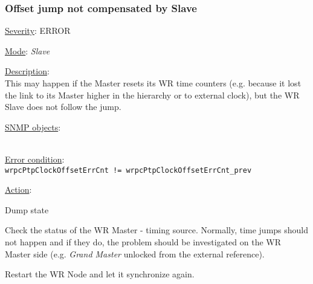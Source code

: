 \subsubsection{\bf Offset jump not compensated by Slave}
		\label{fail:timing:offset_jump}
		\begin{pck_descr}
			\item [] \underline{Severity}: ERROR
			\item [] \underline{Mode}: \emph{Slave}
			\item [] \underline{Description}:\\
				This may happen if the Master resets its WR time counters (e.g. because
				it lost the link to its Master higher in the hierarchy or to external
				clock), but the WR Slave does not follow the jump.
				\item [] \underline{SNMP objects}:\\
				{\footnotesize
				\\
				 }
			\item [] \underline{Error condition}:\\
				{\footnotesize
				\texttt{wrpcPtpClockOffsetErrCnt != wrpcPtpClockOffsetErrCnt\_prev} }
      \item [] \underline{Action}:
        \begin{pck_proc}
        \item Dump state
        \item Check the status of the WR Master - timing source. Normally, time
          jumps should not happen and if they do, the problem should be
          investigated on the WR Master side (e.g. \emph{Grand Master} unlocked
          from the external reference).
        \item Restart the WR Node and let it synchronize again.
        \end{pck_proc}
		\end{pck_descr}

